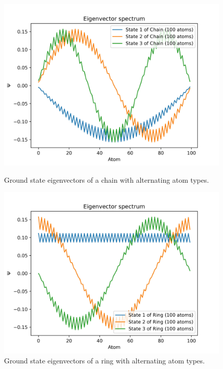 \documentclass{article}
\begin{document}
\begin{figure}[!h]
    \centering
    \begin{minipage}{0.47\textwidth}
        \centering
        \includegraphics[width=\textwidth]{Figures/chain_alpha_eigenvectors.jpg}
        \caption{Ground state eigenvectors of a chain with alternating atom types.}
        \label{fig:chain_alternating_alpha_vec}
    \end{minipage}
    \hfill
    \begin{minipage}{0.47\textwidth}
        \centering
        \includegraphics[width=\textwidth]{Figures/ring_alpha_eigenvectors.jpg}
        \caption{Ground state eigenvectors of a ring with alternating atom types.}
        \label{fig:ring_alternating_alpha_vec}
    \end{minipage}
\end{figure}
\end{document}
